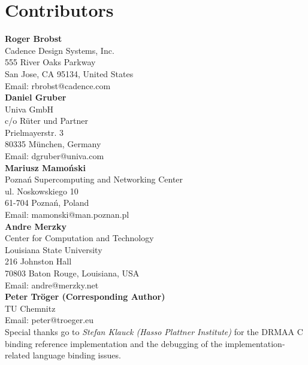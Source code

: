 \documentclass{article}
\begin{document}
\newpage

\section{Contributors}

\textbf{Roger Brobst}\\
Cadence Design Systems, Inc.\\
555 River Oaks Parkway \\
San Jose, CA 95134, United States\\
Email: rbrobst@cadence.com\\

\textbf{Daniel Gruber}\\
Univa GmbH\\
c/o Rüter und Partner\\
Prielmayerstr. 3\\
80335 München, Germany\\
Email: dgruber@univa.com\\

\textbf{Mariusz Mamoński}\\
Poznań Supercomputing and Networking Center\\
ul. Noskowskiego 10\\
61-704 Poznań, Poland\\
Email: mamonski@man.poznan.pl\\

\textbf{Andre Merzky}\\
Center for Computation and Technology\\
Louisiana State University\\
216 Johnston Hall\\
70803 Baton Rouge,  Louisiana, USA\\
Email:  andre@merzky.net\\

\textbf{Peter Tröger (Corresponding Author)} \\
TU Chemnitz\\
Email: peter@troeger.eu \\

Special thanks go to \emph{Stefan Klauck (Hasso Plattner Institute)} for the DRMAA C binding reference implementation and the  debugging of the implementation-related language binding issues.

\end{document}
